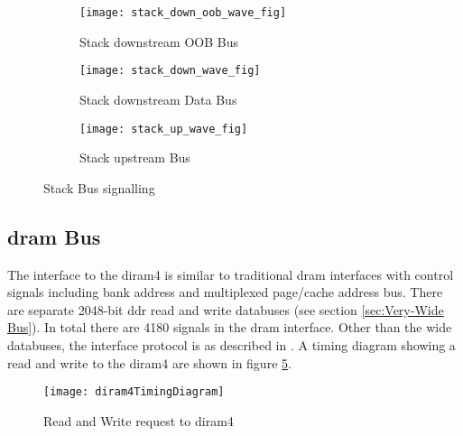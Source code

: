 \begin{figure}
\centering
\begin{subfigure}{.9\textwidth}
  \centering
  \texttt{[image: stack\_down\_oob\_wave\_fig]}
  \captionsetup{justification=centering, skip=10pt}
  \caption{Stack downstream OOB Bus}
  \label{fig:Stack downstream OOB Bus}
\end{subfigure}%

\bigskip

\begin{subfigure}{.9\textwidth}
  \centering
  \texttt{[image: stack\_down\_wave\_fig]}
  \captionsetup{justification=centering, skip=10pt}
  \caption{Stack downstream Data Bus}
  \label{fig:Stack downstream Data Bus}
\end{subfigure}%

\bigskip

\begin{subfigure}{.9\textwidth}
  \centering
  \texttt{[image: stack\_up\_wave\_fig]}
  \captionsetup{justification=centering, skip=10pt}
  \caption{Stack upstream Bus}
  \label{fig:Stack upstream Bus}
\end{subfigure}%

\captionsetup{justification=centering, skip=16pt}
\caption{Stack Bus signalling}
\label{fig:Stack Bus signalling}
\end{figure}


\subsection{\ac{dram} Bus}
\label{sec:DRAM Bus}

The interface to the \ac{diram4} is similar to traditional \ac{dram} interfaces with control signals including bank address and multiplexed page/cache address bus.
There are separate 2048-bit \ac{ddr} read and write databuses (see section \ref{sec:Very-Wide Bus}).
In total there are 4180 signals in the \ac{dram} interface.
Other than the wide databuses, the interface protocol is as described in \cite{tezzaron:diram4}.
A timing diagram showing a read and write to the \ac{diram4} are shown in figure \ref{fig:diram4Timing}.
\begin{figure}[!t]
\centering
\captionsetup{justification=centering}
\captionsetup{width=.9\linewidth}
\centerline{
\mbox{\texttt{[image: diram4TimingDiagram]}}
}
\caption{Read and Write request to \ac{diram4} \cite{tezzaron:diram4}}
\label{fig:diram4Timing}
\end{figure}



